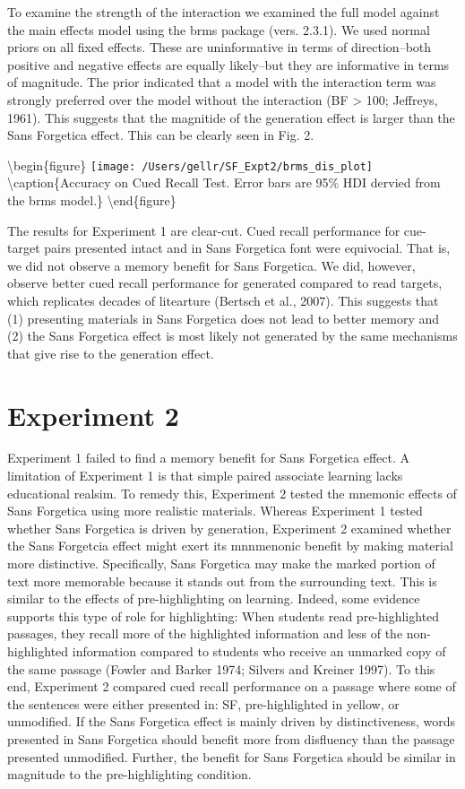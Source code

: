\documentclass[doc]{apa6}
\begin{document}
To examine the strength of the interaction we examined the full model against the main effects model using the brms package (vers. 2.3.1). We used normal priors on all fixed effects. These are uninformative in terms of direction--both positive and negative effects are equally likely--but they are informative in terms of magnitude. The prior indicated that a model with the interaction term was strongly preferred over the model without the interaction (BF \textgreater{} 100; Jeffreys, 1961). This suggests that the magnitide of the generation effect is larger than the Sans Forgetica effect. This can be clearly seen in Fig. 2.

\textbackslash{}begin\{figure\}
\texttt{[image: /Users/gellr/SF\_Expt2/brms\_dis\_plot]} \textbackslash{}caption\{Accuracy on Cued Recall Test. Error bars are 95\% HDI dervied from the brms model.\}\label{fig:unnamed-chunk-3}
\textbackslash{}end\{figure\}

The results for Experiment 1 are clear-cut. Cued recall performance for cue-target pairs presented intact and in Sans Forgetica font were equivocial. That is, we did not observe a memory benefit for Sans Forgetica. We did, however, observe better cued recall performance for generated compared to read targets, which replicates decades of litearture (Bertsch et al., 2007). This suggests that (1) presenting materials in Sans Forgetica does not lead to better memory and (2) the Sans Forgetica effect is most likely not generated by the same mechanisms that give rise to the generation effect.

\hypertarget{experiment-2}{%
\section{Experiment 2}\label{experiment-2}}

Experiment 1 failed to find a memory benefit for Sans Forgetica effect. A limitation of Experiment 1 is that simple paired associate learning lacks educational realsim. To remedy this, Experiment 2 tested the mnemonic effects of Sans Forgetica using more realistic materials. Whereas Experiment 1 tested whether Sans Forgetica is driven by generation, Experiment 2 examined whether the Sans Forgetcia effect might exert its mnnmenonic benefit by making material more distinctive. Specifically, Sans Forgetica may make the marked portion of text more memorable because it stands out from the surrounding text. This is similar to the effects of pre-highlighting on learning. Indeed, some evidence supports this type of role for highlighting: When students read pre-highlighted passages, they recall more of the highlighted information and less of the non-highlighted information compared to students who receive an unmarked copy of the same passage (Fowler and Barker 1974; Silvers and Kreiner 1997). To this end, Experiment 2 compared cued recall performance on a passage where some of the sentences were either presented in: SF, pre-highlighted in yellow, or unmodified. If the Sans Forgetica effect is mainly driven by distinctiveness, words presented in Sans Forgetica should benefit more from disfluency than the passage presented unmodified. Further, the benefit for Sans Forgetica should be similar in magnitude to the pre-highlighting condition.
\end{document}
